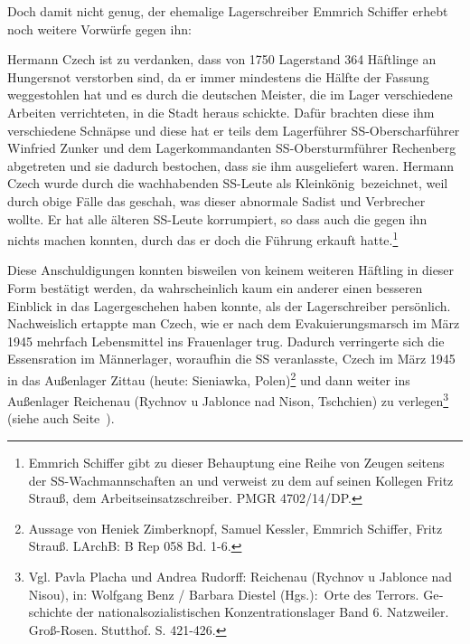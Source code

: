 Doch damit nicht genug, der ehemalige Lagerschreiber Emmrich Schiffer erhebt noch weitere Vorwürfe gegen ihn:
\begin{leftbar}
Hermann Czech ist zu verdanken, dass von 1750 Lagerstand 364 Häftlinge an Hungersnot verstorben sind, da er immer mindestens die Hälfte der Fassung weggestohlen hat und es durch die deutschen Meister, die im Lager verschiedene Arbeiten verrichteten, in die Stadt heraus schickte. Dafür brachten diese ihm verschiedene Schnäpse und diese hat er teils dem Lagerführer SS-Oberscharführer Winfried Zunker und dem Lagerkommandanten SS-Obersturmführer Rechenberg abgetreten und sie dadurch bestochen, dass sie ihm ausgeliefert waren. Hermann Czech wurde durch die wachhabenden SS-Leute als \glqq Kleinkönig\grqq~bezeichnet, weil durch obige Fälle das geschah, was dieser abnormale Sadist und Verbrecher wollte. Er hat alle älteren SS-Leute korrumpiert, so dass auch die gegen ihn nichts machen konnten, durch das er doch die Führung erkauft hatte.\footnote{Emmrich Schiffer gibt zu dieser Behauptung eine Reihe von Zeugen seitens der SS-Wachmannschaften an und verweist zu dem auf seinen Kollegen Fritz Strauß, dem Arbeitseinsatzschreiber. PMGR 4702/14/DP.}
\end{leftbar}
Diese Anschuldigungen konnten bisweilen von keinem weiteren Häftling in dieser Form bestätigt werden, da wahrscheinlich kaum ein anderer einen besseren Einblick in das Lagergeschehen haben konnte, als der Lagerschreiber persönlich. Nachweislich ertappte man Czech, wie er nach dem Evakuierungsmarsch im März 1945 mehrfach Lebensmittel ins Frauenlager trug. Dadurch verringerte sich die Essensration im Männerlager, woraufhin die SS veranlasste, Czech im März 1945 in das Außenlager Zittau (heute: Sieniawka, Polen)\footnote{Aussage von Heniek Zimberknopf, Samuel Kessler, Emmrich Schiffer, Fritz Strauß. LArchB: B Rep 058 Bd. 1-6.} und dann weiter ins Außenlager Reichenau (Rychnov u Jablonce nad Nison, Tschchien) zu verlegen\footnote{Vgl. Pavla Placha und Andrea Rudorff: Reichenau (Rychnov u Jablonce nad Nisou), in: Wolf­gang Benz / Bar­bara Die­s­tel (Hgs.): Orte des Ter­rors. Ge­schichte der na­tional­so­zia­lis­ti­schen Kon­zen­tra­ti­ons­la­ger Band 6. Natz­wei­ler. Groß-Rosen. Stutt­hof. S. 421-426.} (siehe auch Seite~\pageref{czech_ahndung}).

